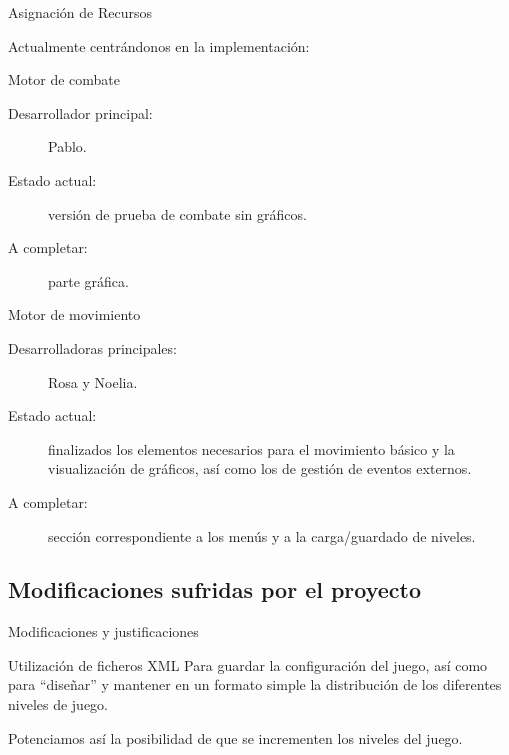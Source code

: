\documentclass[9pt,xcolor=svgnames]{beamer}
\begin{document}
  
  \begin{frame}{Asignación de Recursos}
   
   Actualmente centrándonos en la implementación:
   
   \begin{block}{Motor de combate}
    \begin{description}
     \item[Desarrollador principal:] Pablo.
     \item[Estado actual:] versión de prueba de combate sin gráficos.
     \item[A completar:] parte gráfica.
    \end{description}
   \end{block}

   \begin{block}{Motor de movimiento}
    \begin{description}
     \item[Desarrolladoras principales:] Rosa y Noelia.
     \item[Estado actual:] finalizados los elementos necesarios para el 
		movimiento básico y la visualización de gráficos, así
		como los de gestión de eventos externos. 
     \item[A completar:] sección correspondiente a los menús y a la
	   carga/guardado de niveles.
    \end{description}
   \end{block}
    
  \end{frame}
   
   
   
   \subsection{Modificaciones sufridas por el proyecto}
   
   \begin{frame}{Modificaciones y justificaciones}
    
    \begin{block}{Utilización de ficheros XML}
     Para guardar la configuración del juego, así como para ``diseñar''
     y mantener en un formato simple la distribución de los diferentes
     niveles de juego.\\
     \vspace*{0.5cm}
     
     Potenciamos así la posibilidad de que se incrementen los niveles del
     juego.
    \end{block}
    
   \end{frame}
   
\end{document}
